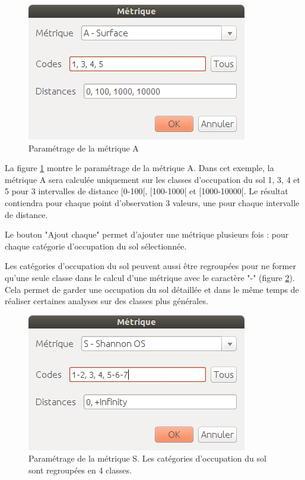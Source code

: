 \documentclass{report}
\begin{document}
\begin{figure}[H]
	\includegraphics[scale=0.5]{img/metric_param-fr.png} 
	\caption{Paramétrage de la métrique A}
	\label{metric_param_dlg}
\end{figure}

La figure \ref{metric_param_dlg} montre le paramétrage de la métrique A. Dans cet exemple, la métrique A sera calculée uniquement sur les classes d'occupation du sol 1, 3, 4 et 5 pour 3 intervalles de distance [0-100[, [100-1000[ et [1000-10000[. Le résultat contiendra pour chaque point d'observation 3 valeurs, une pour chaque intervalle de distance.

Le bouton "Ajout chaque" permet d'ajouter une métrique plusieurs fois : pour chaque catégorie d'occupation du sol sélectionnée.

Les catégories d'occupation du sol peuvent aussi être regroupées pour ne former qu'une seule classe dans le calcul d'une métrique avec le caractère "-" (figure \ref{metric_param_group_dlg}). Cela permet de garder une occupation du sol détaillée et dans le même temps de réaliser certaines analyses sur des classes plus générales.

\begin{figure}[H]
	\includegraphics[scale=0.5]{img/metric_param_group-fr.png} 
	\caption{Paramétrage de la métrique S. Les catégories d'occupation du sol sont regroupées en 4 classes.}
	\label{metric_param_group_dlg}
\end{figure}
\end{document}
